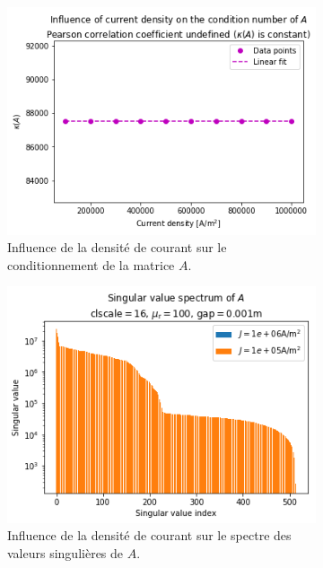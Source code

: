 \documentclass[11pt]{article}
\begin{document}
\begin{figure}[H]
\begin{subfigure}{0.24\textwidth}
		\label{fig:muspec}
	\end{subfigure}
	\begin{subfigure}{0.24\textwidth}
		\centering
		\includegraphics[width=\linewidth]{jcond.png}
		\caption{Influence de la densité de courant sur le conditionnement de la matrice $A$.}
		\label{fig:jcond}
	\end{subfigure}\hfill
	\begin{subfigure}{0.24\textwidth}
		\centering
		\includegraphics[width=\linewidth]{jspec.png}
		\caption{Influence de la densité de courant sur le spectre des valeurs singulières de $A$.}
		\label{fig:jspec}
	\end{subfigure}\hfill
	\begin{subfigure}{0.24\textwidth}

\end{subfigure}
\end{figure}
\end{document}
